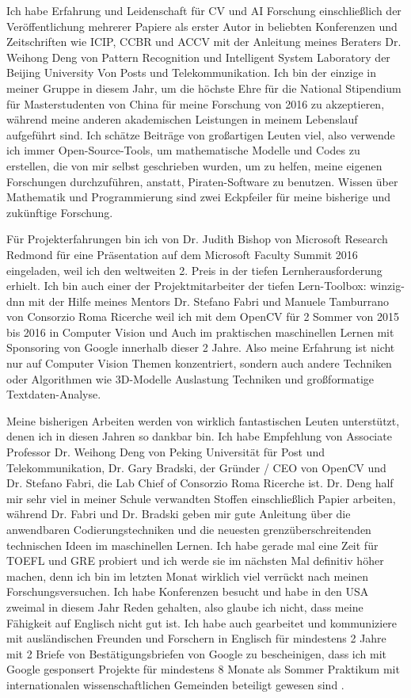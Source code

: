 \documentclass[11pt, a4paper]{awesome-cv} %
\begin{document}
Ich habe Erfahrung und Leidenschaft für CV und AI Forschung einschließlich der Veröffentlichung mehrerer Papiere als erster Autor in beliebten Konferenzen und Zeitschriften wie ICIP, CCBR und ACCV mit der Anleitung meines Beraters Dr. Weihong Deng von Pattern Recognition und Intelligent System Laboratory der Beijing University Von Posts und Telekommunikation. Ich bin der einzige in meiner Gruppe in diesem Jahr, um die höchste Ehre für die National Stipendium für Masterstudenten von China für meine Forschung von 2016 zu akzeptieren, während meine anderen akademischen Leistungen in meinem Lebenslauf aufgeführt sind. Ich schätze Beiträge von großartigen Leuten viel, also verwende ich immer Open-Source-Tools, um mathematische Modelle und Codes zu erstellen, die von mir selbst geschrieben wurden, um zu helfen, meine eigenen Forschungen durchzuführen, anstatt, Piraten-Software zu benutzen. Wissen über Mathematik und Programmierung sind zwei Eckpfeiler für meine bisherige und zukünftige Forschung.

Für Projekterfahrungen bin ich von Dr. Judith Bishop von Microsoft Research Redmond für eine Präsentation auf dem Microsoft Faculty Summit 2016 eingeladen, weil ich den weltweiten 2. Preis in der tiefen Lernherausforderung erhielt. Ich bin auch einer der Projektmitarbeiter der tiefen Lern-Toolbox: winzig-dnn mit der Hilfe meines Mentors Dr. Stefano Fabri und Manuele Tamburrano von Consorzio Roma Ricerche weil ich mit dem OpenCV für 2 Sommer von 2015 bis 2016 in Computer Vision und Auch im praktischen maschinellen Lernen mit Sponsoring von Google innerhalb dieser 2 Jahre. Also meine Erfahrung ist nicht nur auf Computer Vision Themen konzentriert, sondern auch andere Techniken oder Algorithmen wie 3D-Modelle Auslastung Techniken und großformatige Textdaten-Analyse.

Meine bisherigen Arbeiten werden von wirklich fantastischen Leuten unterstützt, denen ich in diesen Jahren so dankbar bin. Ich habe Empfehlung von Associate Professor Dr. Weihong Deng von Peking Universität für Post und Telekommunikation, Dr. Gary Bradski, der Gründer / CEO von OpenCV und Dr. Stefano Fabri, die Lab Chief of Consorzio Roma Ricerche ist. Dr. Deng half mir sehr viel in meiner Schule verwandten Stoffen einschließlich Papier arbeiten, während Dr. Fabri und Dr. Bradski geben mir gute Anleitung über die anwendbaren Codierungstechniken und die neuesten grenzüberschreitenden technischen Ideen im maschinellen Lernen. Ich habe gerade mal eine Zeit für TOEFL und GRE probiert und ich werde sie im nächsten Mal definitiv höher machen, denn ich bin im letzten Monat wirklich viel verrückt nach meinen Forschungsversuchen. Ich habe Konferenzen besucht und habe in den USA zweimal in diesem Jahr Reden gehalten, also glaube ich nicht, dass meine Fähigkeit auf Englisch nicht gut ist. Ich habe auch gearbeitet und kommuniziere mit ausländischen Freunden und Forschern in Englisch für mindestens 2 Jahre mit 2 Briefe von Bestätigungsbriefen von Google zu bescheinigen, dass ich mit Google gesponsert Projekte für mindestens 8 Monate als Sommer Praktikum mit internationalen wissenschaftlichen Gemeinden beteiligt gewesen sind .
\end{document}

